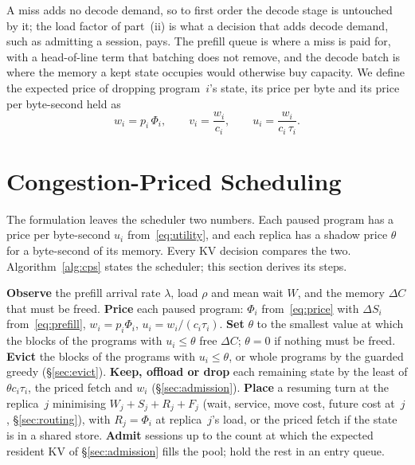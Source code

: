 \documentclass{article}
\theoremstyle{plain}
\theoremstyle{definition}
\theoremstyle{remark}
\begin{document}
A miss adds no decode demand, so to first order the decode stage is
untouched by it; the load factor of part~(ii) is what a decision that
adds decode demand, such as admitting a session, pays. The prefill
queue is where a miss is paid for, with a head-of-line term that
batching does not remove, and the decode batch is where the memory a
kept state occupies would otherwise buy capacity. We define the
expected price of dropping program~$i$'s state, its price per byte and
its price per byte-second held as
\begin{equation}\label{eq:utility}
  w_i = p_i\,\Phi_i, \qquad v_i=\frac{w_i}{c_i}, \qquad
  u_i=\frac{w_i}{c_i\,\tau_i}.
\end{equation}

\section{Congestion-Priced Scheduling}\label{sec:sched}

The formulation leaves the scheduler two numbers. Each paused program
has a price per byte-second $u_i$ from~\eqref{eq:utility}, and each
replica has a shadow price $\theta$ for a byte-second of its memory.
Every KV decision compares the two. Algorithm~\ref{alg:cps} states the
scheduler; this section derives its steps.

\begin{algorithm}[t]
\caption{Congestion-priced scheduling at one replica}
\label{alg:cps}
\begin{algorithmic}[1]
\STATE \textbf{Observe} the prefill arrival rate $\lambda$, load $\rho$
  and mean wait $W$, and the memory $\Delta C$ that must be freed.
\STATE \textbf{Price} each paused program: $\Phi_i$
  from~\eqref{eq:price} with $\Delta S_i$ from~\eqref{eq:prefill},
  $w_i=p_i\Phi_i$, $u_i=w_i/(c_i\tau_i)$.
\STATE \textbf{Set} $\theta$ to the smallest value at which the blocks
  of the programs with $u_i\le\theta$ free $\Delta C$; $\theta=0$ if
  nothing must be freed.
\STATE \textbf{Evict} the blocks of the programs with $u_i\le\theta$,
  or whole programs by the guarded greedy (\S\ref{sec:evict}).
\STATE \textbf{Keep, offload or drop} each remaining state by the least
  of $\theta c_i\tau_i$, the priced fetch and $w_i$
  (\S\ref{sec:admission}).
\STATE \textbf{Place} a resuming turn at the replica~$j$ minimising
  $W_j+S_j+R_j+F_j$ (wait, service, move cost, future cost at~$j$,
  \S\ref{sec:routing}), with $R_j=\Phi_i$ at replica~$j$'s load, or the
  priced fetch if the state is in a shared store.
\STATE \textbf{Admit} sessions up to the count at which the expected
  resident KV of \S\ref{sec:admission} fills the pool; hold the rest in
  an entry queue.
\end{algorithmic}
\end{algorithm}
\end{document}
